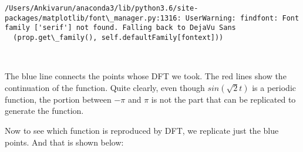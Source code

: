 \documentclass[11pt]{article}
\begin{document}
    \begin{Verbatim}[commandchars=\\\{\}]
/Users/Ankivarun/anaconda3/lib/python3.6/site-packages/matplotlib/font\_manager.py:1316: UserWarning: findfont: Font family ['serif'] not found. Falling back to DejaVu Sans
  (prop.get\_family(), self.defaultFamily[fontext]))

    \end{Verbatim}

    \begin{center}
    \end{center}
    { \hspace*{\fill} \\}
    
    The blue line connects the points whose DFT we took. The red lines show
the continuation of the function. Quite clearly, even though
\(sin (\sqrt{2}t)\) is a periodic function, the portion between \(−\pi\)
and \(\pi\) is not the part that can be replicated to generate the
function.

Now to see which function is reproduced by DFT, we replicate just the
blue points. And that is shown below:
\end{document}
